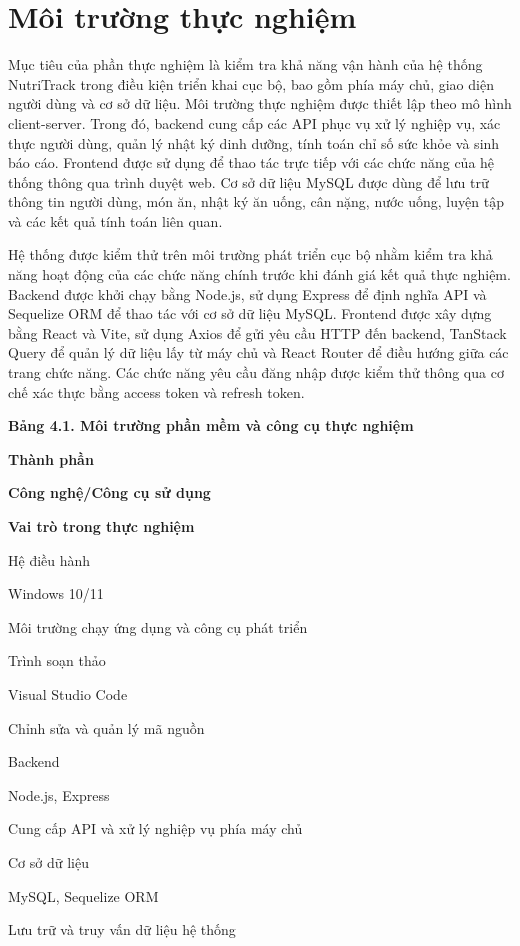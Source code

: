 \documentclass[12pt, a4paper]{report}
\begin{document}
\section{Môi trường thực nghiệm}Mục tiêu của phần thực nghiệm là kiểm tra khả năng vận hành của hệ thống NutriTrack trong điều kiện triển khai cục bộ, bao gồm phía máy chủ, giao diện người dùng và cơ sở dữ liệu. Môi trường thực nghiệm được thiết lập theo mô hình client-server. Trong đó, backend cung cấp các API phục vụ xử lý nghiệp vụ, xác thực người dùng, quản lý nhật ký dinh dưỡng, tính toán chỉ số sức khỏe và sinh báo cáo. Frontend được sử dụng để thao tác trực tiếp với các chức năng của hệ thống thông qua trình duyệt web. Cơ sở dữ liệu MySQL được dùng để lưu trữ thông tin người dùng, món ăn, nhật ký ăn uống, cân nặng, nước uống, luyện tập và các kết quả tính toán liên quan.

Hệ thống được kiểm thử trên môi trường phát triển cục bộ nhằm kiểm tra khả năng hoạt động của các chức năng chính trước khi đánh giá kết quả thực nghiệm. Backend được khởi chạy bằng Node.js, sử dụng Express để định nghĩa API và Sequelize ORM để thao tác với cơ sở dữ liệu MySQL. Frontend được xây dựng bằng React và Vite, sử dụng Axios để gửi yêu cầu HTTP đến backend, TanStack Query để quản lý dữ liệu lấy từ máy chủ và React Router để điều hướng giữa các trang chức năng. Các chức năng yêu cầu đăng nhập được kiểm thử thông qua cơ chế xác thực bằng access token và refresh token.

\textbf{Bảng 4.1. Môi trường phần mềm và công cụ thực nghiệm}

\textbf{Thành phần}

\textbf{Công nghệ/Công cụ sử dụng}

\textbf{Vai trò trong thực nghiệm}

Hệ điều hành

Windows 10/11

Môi trường chạy ứng dụng và công cụ phát triển

Trình soạn thảo

Visual Studio Code

Chỉnh sửa và quản lý mã nguồn

Backend

Node.js, Express

Cung cấp API và xử lý nghiệp vụ phía máy chủ

Cơ sở dữ liệu

MySQL, Sequelize ORM

Lưu trữ và truy vấn dữ liệu hệ thống
\end{document}
